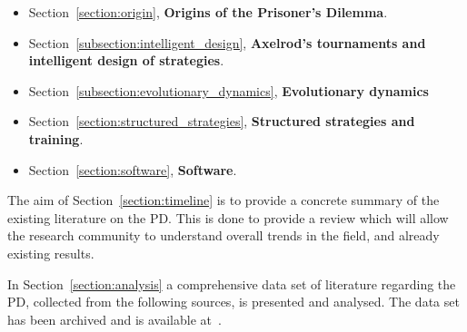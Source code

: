 \documentclass{article}
\theoremstyle{definition}
\begin{document}
\begin{itemize}
    \item Section~\ref{section:origin}, \textbf{Origins of the Prisoner's
    Dilemma}.
    \item Section~\ref{subsection:intelligent_design}, \textbf{Axelrod's
    tournaments and intelligent design of strategies}.
    \item Section~\ref{subsection:evolutionary_dynamics}, \textbf{Evolutionary dynamics}
    \item Section~\ref{section:structured_strategies}, \textbf{Structured
    strategies and training}.
    \item Section~\ref{section:software}, \textbf{Software}.
\end{itemize}

The aim of Section~\ref{section:timeline} is to provide a concrete summary of
the existing literature on the PD. This is done to provide a review which will
allow the research community to understand overall trends in the field, and
already existing results.

In Section~\ref{section:analysis} a comprehensive data set of literature
regarding the PD, collected from the following sources, is presented and
analysed. The data set has been archived and is available at~\cite{pd_data_2018}.
\end{document}
